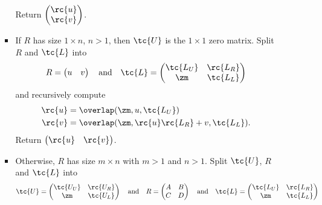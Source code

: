 \begin{itemize}
\begin{enumerate}
\begin{itemize}
        Return $\begin{pmatrix}
            \rc{u}\\
            \rc{v}
          \end{pmatrix}$.
        \item If $R$ has size $1 \times n$, $n > 1$, then $\tc{U}$ is the $1 \times 1$ zero matrix. Split $R$ and $\tc{L}$ into 
          \begin{equation*}
            R = 
            \begin{pmatrix}
              u & v
            \end{pmatrix}
            \quad \text{and}\quad
            \tc{L} = 
            \begin{pmatrix}
              \tc{L_U} & \rc{L_R}\\
              \zm   & \tc{L_L} 
            \end{pmatrix}
          \end{equation*}
          and recursively compute 
          \begin{align*}
            \rc{u} &= \overlap(\zm,u,\tc{L_U})\\
            \rc{v} &= \overlap(\zm,\rc{u}\rc{L_R} + v,\tc{L_L}).
          \end{align*} 
          Return $
            \begin{pmatrix}
              \rc{u} & \rc{v}
            \end{pmatrix}$.
        \item Otherwise, $R$ has size $m \times n$ with $m > 1$ and $n > 1$. Split $\tc{U}$, $R$ and $\tc{L}$ into 
          \begin{equation*}
            \tc{U} = 
            \begin{pmatrix}
              \tc{U_U} & \rc{U_R} \\
              \zm      & \tc{U_L} 
            \end{pmatrix}
            \quad \text{and}\quad
            R = 
            \begin{pmatrix}
              A & B \\
              C & D
            \end{pmatrix}
            \quad \text{and}\quad
            \tc{L} = 
            \begin{pmatrix}
              \tc{L_U} & \rc{L_R}\\
              \zm   & \tc{L_L} 
            \end{pmatrix}
          \end{equation*}

\end{itemize}
\end{enumerate}
\end{itemize}
